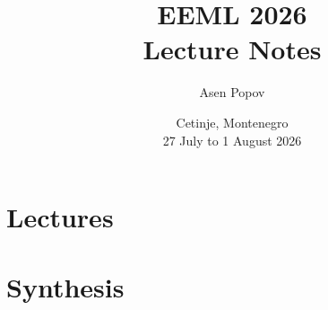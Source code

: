 \documentclass[11pt,a4paper,oneside,openany]{memoir}
\title{\Huge EEML 2026\\[4pt] \Large Lecture Notes}
\author{Asen Popov}
\date{Cetinje, Montenegro \\ 27 July to 1 August 2026}
\begin{document}
\frontmatter
\maketitle

\begin{KeepFromToc}
\tableofcontents
\end{KeepFromToc}

\mainmatter



\part{Lectures}












\part{Synthesis}




\backmatter
\printbibliography[heading=bibintoc,title={References}]
\end{document}
